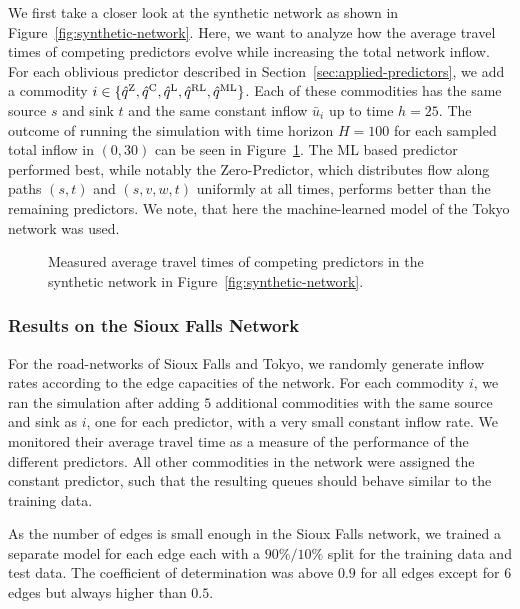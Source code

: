 We first take a closer look at the synthetic network as shown in Figure~\ref{fig:synthetic-network}.
Here, we want to analyze how the average travel times of competing predictors evolve while increasing the total network inflow. 
For each oblivious predictor described in Section~\ref{sec:applied-predictors}, we add a commodity $i\in\{\hat q^{\text{Z}}, \hat q^{\text{C}}, \hat q^{\text{L}}, \hat q^{\text{RL}}, \hat q^{\text{ML}} \}$.
Each of these commodities has the same source $s$ and sink $t$ and the same constant inflow $\bar u_i$ up to time $h=25$.
The outcome of running the simulation with time horizon $H=100$ for each sampled total inflow in $(0, 30)$ can be seen in Figure~\ref{fig:synthetic-travel-times}.
The ML based predictor performed best, while notably the Zero-Predictor, which distributes flow along paths $(s,t)$ and $(s,v,w,t)$ uniformly at all times, performs better than the remaining predictors.
We note, that here the machine-learned model of the Tokyo network was used.

\begin{figure}
    \centering
    
    \caption{Measured average travel times of competing predictors in the synthetic network in Figure~\ref{fig:synthetic-network}.}\label{fig:synthetic-travel-times}
\end{figure}



\subsubsection*{Results on the Sioux Falls Network}

For the road-networks of Sioux Falls and Tokyo, we randomly generate inflow rates according to the edge capacities of the network.
For each commodity $i$, we ran the simulation after adding $5$ additional commodities with the same source and sink as $i$, one for each predictor, with a very small constant inflow rate.
We monitored their average travel time as a measure of the performance of the different predictors.
All other commodities in the network were assigned the constant predictor, such that the resulting queues should behave similar to the training data.

As the number of edges is small enough in the Sioux Falls network, we trained a separate model for each edge each with a $90\% / 10\%$ split for the training data and test data.
The coefficient of determination was above $0{.}9$ for all edges except for $6$ edges but always higher than $0{.}5$.

